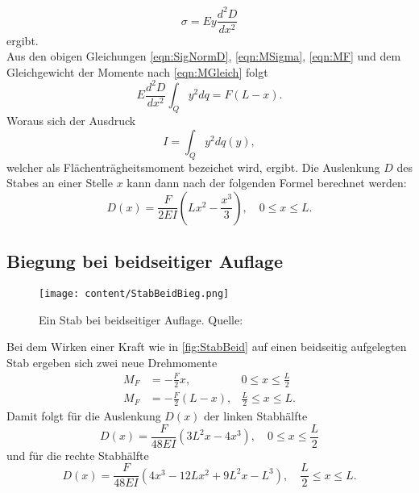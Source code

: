 \begin{equation}
    \label{eqn:SigNormD}
    \sigma = Ey\frac{d^2D}{dx^2}
\end{equation}
ergibt. \\
Aus den obigen Gleichungen \eqref{eqn:SigNormD}, \eqref{eqn:MSigma}, \eqref{eqn:MF} und dem Gleichgewicht der Momente nach \eqref{eqn:MGleich} folgt
\begin{equation*}
    E\frac{d^2D}{dx^2} \int_Q y^2dq = F(L-x).
\end{equation*}
Woraus sich der Ausdruck
\begin{equation*}
    I = \int_Q y^2dq(y),
\end{equation*}
welcher als Flächenträgheitsmoment bezeichet wird, ergibt.
Die Auslenkung $D$ des Stabes an einer Stelle $x$ kann dann nach der folgenden Formel berechnet werden:
\begin{equation*}
    \label{eqn:DvonX}
    D\left(x\right) = \frac{F}{2EI}\left(Lx^2-\frac{x^3}{3}\right),\quad 0\leq x \leq L.
\end{equation*}
\subsection{Biegung bei beidseitiger Auflage}
\label{subsec:BeidseitigeAuflage}
\begin{figure}[H]
    \centering
    \texttt{[image: content/StabBeidBieg.png]}
    \caption{Ein Stab bei beidseitiger Auflage. Quelle: \cite{sample}}  %
    \label{fig:StabBeid}
\end{figure}
Bei dem Wirken einer Kraft wie in \autoref{fig:StabBeid} auf einen beidseitig aufgelegten Stab ergeben sich zwei neue Drehmomente
\begin{align*}
    M_F &= -\frac{F}{2}x, &0 \leq x \leq \frac{L}{2}\\
    M_F &= -\frac{F}{2}(L-x), &\frac{L}{2} \leq x \leq L.
\end{align*}
Damit folgt für die Auslenkung $D(x)$ der linken Stabhälfte
\begin{equation*}
    D(x) = \frac{F}{48EI}\left(3L^2x-4x^3\right), \quad 0 \leq x \leq \frac{L}{2}
\end{equation*}
und für die rechte Stabhälfte
\begin{equation*}
    D(x) = \frac{F}{48EI}\left(4x^3 - 12Lx^2 + 9L^2x - L^3\right), \quad \frac{L}{2} \leq x \leq L.
\end{equation*}

